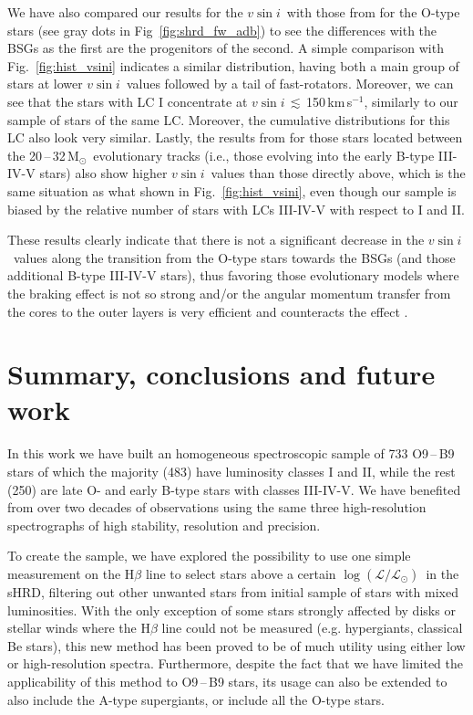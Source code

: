 \documentclass{aa}
\newcommand{\kms}{\mbox{km\,s$^{-1}$}}
\newcommand{\vsini}{\mbox{$v\sin i$}}
\newcommand{\MSol}{\mbox{M$_\odot$}}
\newcommand{\logLs}{$\log (\mathcal{L}/\mathcal{L}_{\odot})$}
\newcommand{\ls}{\mbox{$\lesssim$}}
\begin{document}
We have also compared our results for the \vsini\ with those from \citet{2022A&A...665A.150H} for the O-type stars (see gray dots in Fig~\ref{fig:shrd_fw_adb}) to see the differences with the BSGs as the first are the progenitors of the second. A simple comparison with Fig.~\ref{fig:hist_vsini} indicates a similar distribution, having both a main group of stars at lower \vsini\ values followed by a tail of fast-rotators. Moreover, we can see that the stars with LC I concentrate at \vsini\,\ls\,150\,\kms, similarly to our sample of stars of the same LC. Moreover, the cumulative distributions for this LC also look very similar. Lastly, the results from \citet{2022A&A...665A.150H} for those stars located between the 20\,--\,32\,\MSol\ evolutionary tracks (i.e., those evolving into the early B-type III-IV-V stars) also show higher \vsini\ values than those directly above, which is the same situation as what shown in Fig.~\ref{fig:hist_vsini}, even though our sample is biased by the relative number of stars with LCs III-IV-V with respect to I and II.

These results clearly indicate that there is not a significant decrease in the \vsini\ values along the transition from the O-type stars towards the BSGs (and those additional B-type III-IV-V stars), thus favoring those evolutionary models where the braking effect is not so strong and/or the angular momentum transfer from the cores to the outer layers is very efficient and counteracts the effect \citep[see][]{2011A&A...530A.115B}.






\section{Summary, conclusions and future work}
\label{section:5_XXXXXX}

In this work we have built an homogeneous spectroscopic sample of 733 O9\,--\,B9 stars of which the majority (483) have luminosity classes I and II, while the rest (250) are late O- and early B-type stars with classes III-IV-V. We have benefited from over two decades of observations using the same three high-resolution spectrographs of high stability, resolution and precision.

To create the sample, we have explored the possibility to use one simple measurement on the H$\beta$ line to select stars above a certain \logLs\ in the sHRD, filtering out other unwanted stars from initial sample of stars with mixed luminosities. With the only exception of some stars strongly affected by disks or stellar winds where the H$\beta$ line could not be measured (e.g. hypergiants, classical Be stars), this new method has been proved to be of much utility using either low or high-resolution spectra. Furthermore, despite the fact that we have limited the applicability of this method to O9\,--\,B9 stars, its usage can also be extended to also include the A-type supergiants, or include all the O-type stars.
\end{document}
